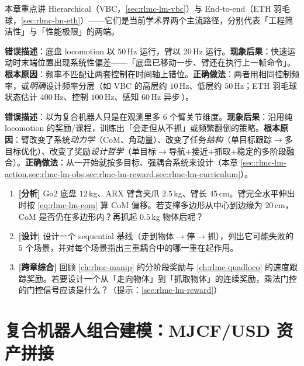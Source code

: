 本章重点讲 Hierarchical（VBC，\cref{sec:rlmc-lm-vbc}）与 End-to-end（ETH 羽毛球，\cref{sec:rlmc-lm-eth}）——它们是当前学术界两个主流路径，分别代表「工程简洁性」与「性能极限」的两端。

\begin{pitfall}[底盘策略和臂策略使用不同控制频率]
\textbf{错误描述}：底盘 locomotion 以 $50\,$Hz 运行，臂以 $20\,$Hz 运行。\textbf{现象后果}：快速运动时末端位置出现系统性偏差——「底盘已移动一步、臂还在执行上一帧命令」。\textbf{根本原因}：频率不匹配让两套控制在时间轴上错位。\textbf{正确做法}：两者用相同控制频率，或\emph{明确}设计频率分层（如 VBC 的高层约 $10\,$Hz、低层约 $50\,$Hz；ETH 羽毛球状态估计 $400\,$Hz、控制 $100\,$Hz、感知 $60\,$Hz 异步\,\cite{ma2025badminton}）。
\end{pitfall}

\begin{pitfall}
\textbf{错误描述}：以为复合机器人只是在观测里多 $6$ 个臂关节维度。\textbf{现象后果}：沿用纯 locomotion 的奖励/课程，训练出「会走但从不抓」或频繁翻倒的策略。\textbf{根本原因}：臂改变了系统\emph{动力学}（CoM、角动量）、改变了任务\emph{结构}（单目标跟踪$\to$多目标优化）、改变了奖励\emph{设计哲学}（单目标$\to$导航+接近+抓取+稳定的多阶段融合）。\textbf{正确做法}：从一开始就按多目标、强耦合系统来设计（本章 \cref{sec:rlmc-lm-action,sec:rlmc-lm-obs,sec:rlmc-lm-reward,sec:rlmc-lm-curriculum}）。
\end{pitfall}

\begin{practice}[练习·耦合分析]
\begin{enumerate}
\item \textbf{[分析]} Go2 底盘 $12\,$kg、ARX 臂含夹爪 $2.5\,$kg、臂长 $45\,$cm。臂完全水平伸出时按 \cref{eq:rlmc-lm-com} 算 CoM 偏移。若支撑多边形从中心到边缘为 $20\,$cm，CoM 是否仍在多边形内？再抓起 $0.5\,$kg 物体后呢？
\item \textbf{[设计]} 设计一个 sequential 基线（走到物体$\to$停$\to$抓），列出它可能失败的 $5$ 个场景，并对每个场景指出三重耦合中的哪一重在起作用。
\item \textbf{[跨章综合]} 回顾 \cref{ch:rlmc-manip} 的分阶段奖励与 \cref{ch:rlmc-quadloco} 的速度跟踪奖励。若要设计一个从「走向物体」到「抓取物体」的连续奖励，乘法门控的门控信号应该是什么？（提示：\cref{sec:rlmc-lm-reward}）
\end{enumerate}
\end{practice}

\section{复合机器人组合建模：MJCF/USD 资产拼接}
\label{sec:rlmc-lm-asset}

